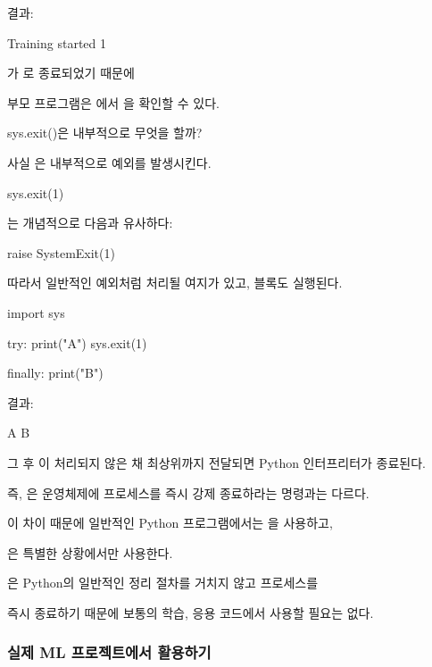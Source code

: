 결과:

\begin{dhkzsh}
Training started
1
\end{dhkzsh}

가 로 종료되었기 때문에

부모 프로그램은 에서 을 확인할 수 있다.

\begin{dhknote}
\begin{dhksmry}[centered]
sys.exit()은 내부적으로 무엇을 할까?
\end{dhksmry}
\end{dhknote}

사실 은 내부적으로  예외를 발생시킨다.

\begin{dhkcode}
sys.exit(1)
\end{dhkcode}

는 개념적으로 다음과 유사하다:

\begin{dhkcode}
raise SystemExit(1)
\end{dhkcode}

따라서 일반적인 예외처럼 처리될 여지가 있고,  블록도 실행된다.

\begin{dhkcode}
import sys

try:
    print("A")
    sys.exit(1)

finally:
    print("B")
\end{dhkcode}

결과:

\begin{dhkzsh}
A
B
\end{dhkzsh}

그 후 이 처리되지 않은 채 최상위까지 전달되면 Python 인터프리터가 종료된다.

즉, 은 운영체제에 프로세스를 즉시 강제 종료하라는 명령과는 다르다.

이 차이 때문에 일반적인 Python 프로그램에서는 을 사용하고,

은 특별한 상황에서만 사용한다.

은 Python의 일반적인 정리 절차를 거치지 않고 프로세스를 

즉시 종료하기 때문에 보통의 학습, 응용 코드에서 사용할 필요는 없다.

\subsubsection{실제 ML 프로젝트에서 활용하기}


